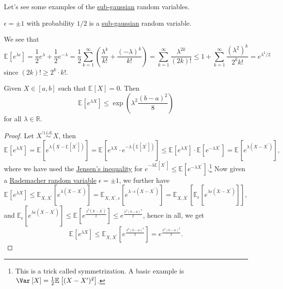 Let's see some examples of the \hyperref[def:sub-gaussian]{sub-gaussian} random variables.

\begin{eg}\label{eg:Rademacher-random-varaible}
	\(\epsilon = \pm 1\) with probability \(1 / 2\) is a \hyperref[def:sub-gaussian]{sub-gaussian} random variable.

\end{eg}
\begin{explanation}
	We see that
	\[
		\mathbb{E}_{}\left[e^{\lambda \epsilon } \right]
		= \frac{1}{2} e^\lambda + \frac{1}{2} e^{-\lambda }
		= \frac{1}{2} \sum_{k=1}^{\infty} \left( \frac{\lambda ^k}{k!} + \frac{(-\lambda )^k}{k!} \right)
		= \sum_{k=1}^{\infty} \frac{\lambda ^{2k}}{(2k)!}
		\leq 1 + \sum_{k=1}^{\infty} \frac{(\lambda ^2)^k}{2^k k!}
		= e^{\lambda ^2 / 2}
	\]
	since \((2k)! \geq 2^k \cdot k!\).
\end{explanation}

\begin{lemma}
	Given \(X\in [a, b]\) such that \(\mathbb{E}_{}\left[X \right] = 0\). Then
	\[
		\mathbb{E}_{}\left[e^{\lambda X} \right] \leq \exp (\lambda ^2 \frac{(b-a)^2}{8})
	\]
	for all \(\lambda \in \mathbb{R} \).
\end{lemma}
\begin{proof}
	Let \(X^{\prime} \overset{\text{i.i.d.} }{\sim } X\), then
	\[
		\mathbb{E}_{}\left[e^{\lambda X} \right]
		= \mathbb{E}_{}\left[e^{\lambda (X - \mathbb{E}_{}\left[X^{\prime}  \right] )} \right]
		= \mathbb{E}_{}\left[e^{\lambda X}\cdot e^{-\lambda (\mathbb{E}_{}\left[X^{\prime}  \right] )} \right]
		\leq \mathbb{E}_{}\left[e^{\lambda X} \right] \cdot \mathbb{E}_{}\left[e^{-\lambda X^{\prime} } \right]
		= \mathbb{E}_{}\left[e^{\lambda (X - X^{\prime} )} \right],
	\]
	where we have used the \href{https://en.wikipedia.org/wiki/Jensen%27s_inequality}{Jensen's inequality} for \(e^{-\lambda \mathbb{E}_{}\left[X^{\prime}  \right] } \leq \mathbb{E}_{}\left[e^{-\lambda X^{\prime} } \right] \).\footnote{This is a trick called symmetrization. A basic example is \(\Var_{}\left[X \right] = \frac{1}{2} \mathbb{E}_{}\left[(X - X^{\prime} )^2 \right] \).} Now given a \hyperref[eg:Rademacher-random-varaible]{Rademacher random variable} \(\epsilon = \pm 1\), we further have
	\[
		\mathbb{E}_{}\left[e^{\lambda X} \right]
		\leq \mathbb{E}_{X, X^{\prime} }\left[e^{\lambda (X - X^{\prime} )} \right]
		= \mathbb{E}_{X, X^{\prime} , \epsilon }\left[ e^{\lambda \cdot \epsilon (X - X^{\prime} )} \right]
		= \mathbb{E}_{X, X^{\prime} }\left[ \mathbb{E}_{\epsilon }\left[e^{\lambda \epsilon (X - X^{\prime} )} \right]  \right] ,
	\]
	and \(\mathbb{E}_{\epsilon }\left[ e^{\lambda \epsilon (X - X^{\prime} )} \right] \leq \mathbb{E}_{}\left[e^{\frac{\lambda ^2(X - X^{\prime} )}{2}} \right] \leq e^{\frac{\lambda ^2(b - a)^2}{2}} \), hence in all, we get
	\[
		\mathbb{E}_{}\left[e^{\lambda X} \right] \leq \mathbb{E}_{X, X^{\prime} }\left[e^{\frac{\lambda ^2(b-a)^2}{2}} \right] = e^{\frac{\lambda ^2(b-a)^2}{2}}.
	\]
\end{proof}

